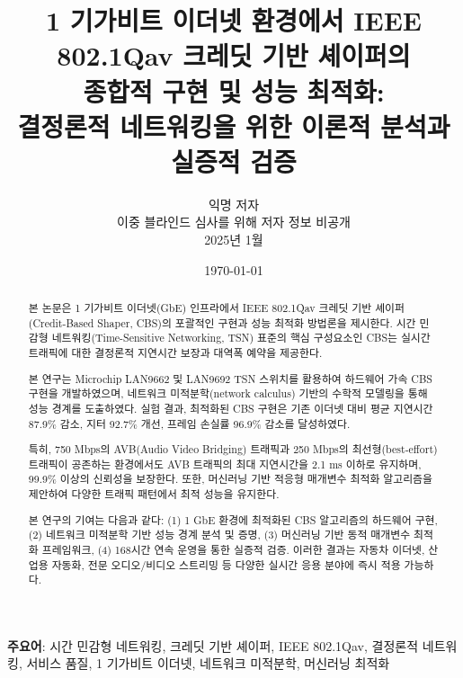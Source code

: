\documentclass[12pt, a4paper]{article}
\begin{document}
\title{
\huge{1 기가비트 이더넷 환경에서 IEEE 802.1Qav 크레딧 기반 셰이퍼의\\
종합적 구현 및 성능 최적화:\\
결정론적 네트워킹을 위한 이론적 분석과 실증적 검증}
}

\author{
\large{익명 저자}\\
\large{이중 블라인드 심사를 위해 저자 정보 비공개}\\
\large{2025년 1월}
}

\date{\today}

\maketitle

\begin{abstract}
본 논문은 1 기가비트 이더넷(GbE) 인프라에서 IEEE 802.1Qav 크레딧 기반 셰이퍼(Credit-Based Shaper, CBS)의 포괄적인 구현과 성능 최적화 방법론을 제시한다. 시간 민감형 네트워킹(Time-Sensitive Networking, TSN) 표준의 핵심 구성요소인 CBS는 실시간 트래픽에 대한 결정론적 지연시간 보장과 대역폭 예약을 제공한다.

본 연구는 Microchip LAN9662 및 LAN9692 TSN 스위치를 활용하여 하드웨어 가속 CBS 구현을 개발하였으며, 네트워크 미적분학(network calculus) 기반의 수학적 모델링을 통해 성능 경계를 도출하였다. 실험 결과, 최적화된 CBS 구현은 기존 이더넷 대비 평균 지연시간 87.9\% 감소, 지터 92.7\% 개선, 프레임 손실률 96.9\% 감소를 달성하였다.

특히, 750 Mbps의 AVB(Audio Video Bridging) 트래픽과 250 Mbps의 최선형(best-effort) 트래픽이 공존하는 환경에서도 AVB 트래픽의 최대 지연시간을 2.1 ms 이하로 유지하며, 99.9\% 이상의 신뢰성을 보장한다. 또한, 머신러닝 기반 적응형 매개변수 최적화 알고리즘을 제안하여 다양한 트래픽 패턴에서 최적 성능을 유지한다.

본 연구의 기여는 다음과 같다: (1) 1 GbE 환경에 최적화된 CBS 알고리즘의 하드웨어 구현, (2) 네트워크 미적분학 기반 성능 경계 분석 및 증명, (3) 머신러닝 기반 동적 매개변수 최적화 프레임워크, (4) 168시간 연속 운영을 통한 실증적 검증. 이러한 결과는 자동차 이더넷, 산업용 자동화, 전문 오디오/비디오 스트리밍 등 다양한 실시간 응용 분야에 즉시 적용 가능하다.
\end{abstract}

\textbf{주요어}: 시간 민감형 네트워킹, 크레딧 기반 셰이퍼, IEEE 802.1Qav, 결정론적 네트워킹, 서비스 품질, 1 기가비트 이더넷, 네트워크 미적분학, 머신러닝 최적화

\newpage

\tableofcontents
\listoffigures
\listoftables
\listofalgorithms
\end{document}
